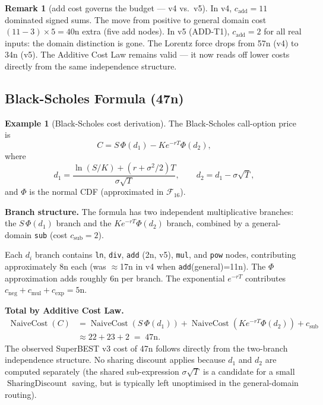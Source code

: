 \documentclass[12pt,a4paper]{article}
\theoremstyle{definition}
\newtheorem{remark}[theorem]{Remark}
\newtheorem{example}[theorem]{Example}
\newcommand{\NC}{\operatorname{NaiveCost}}
\newcommand{\SD}{\operatorname{SharingDiscount}}
\begin{document}
\begin{remark}[add cost governs the budget --- v4 vs.\ v5]
\label{rem:add11}
In v4, $c_{\mathrm{add}} = 11$ dominated signed sums.  The move from positive
to general domain cost $(11-3) \times 5 = 40$n extra (five add nodes).
In v5 (ADD-T1), $c_{\mathrm{add}} = 2$ for all real inputs: the domain
distinction is gone.  The Lorentz force drops from 57n (v4) to 34n (v5).
The Additive Cost Law remains valid --- it now reads off lower costs directly
from the same independence structure.
\end{remark}

\subsection{Black-Scholes Formula (47n)}

\begin{example}[Black-Scholes cost derivation]
\label{ex:bs}
The Black-Scholes call-option price is
\[
  C = S\,\Phi(d_1) - K e^{-rT}\Phi(d_2),
\]
where
\[
  d_1 = \frac{\ln(S/K) + (r + \sigma^2/2)T}{\sigma\sqrt{T}},
  \qquad
  d_2 = d_1 - \sigma\sqrt{T},
\]
and $\Phi$ is the normal CDF (approximated in $\mathcal{F}_{16}$).

\textbf{Branch structure.}  The formula has two independent multiplicative
branches: the $S\,\Phi(d_1)$ branch and the $Ke^{-rT}\Phi(d_2)$ branch,
combined by a general-domain \texttt{sub} (cost $c_{\mathrm{sub}} = 2$).

Each $d_i$ branch contains \texttt{ln}, \texttt{div}, \texttt{add} (2n, v5),
\texttt{mul}, and \texttt{pow} nodes, contributing approximately 8n each (was $\approx$17n in v4 when \texttt{add}(general)=11n).
The $\Phi$ approximation adds roughly 6n per branch.  The exponential
$e^{-rT}$ contributes $c_{\mathrm{neg}} + c_{\mathrm{mul}} + c_{\exp} = 5$n.

\textbf{Total by Additive Cost Law.}
\begin{align*}
  \NC(C)
  &= \NC(S\,\Phi(d_1))
   + \NC(K e^{-rT}\Phi(d_2))
   + c_{\mathrm{sub}} \\
  &\approx 22 + 23 + 2
  \;=\; 47\mathrm{n}.
\end{align*}
The observed SuperBEST v3 cost of 47n follows directly from the two-branch
independence structure.  No sharing discount applies because $d_1$ and $d_2$
are computed separately (the shared sub-expression $\sigma\sqrt{T}$ is a
candidate for a small $\SD$ saving, but is typically left unoptimised in
the general-domain routing).
\end{example}
\end{document}
